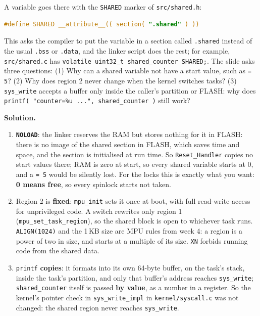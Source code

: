 A variable goes there with the \texttt{SHARED} marker of \texttt{src/shared.h}:
\begin{lstlisting}[language=C, showstringspaces=false, basicstyle=\ttfamily\footnotesize]
#define SHARED __attribute__(( section( ".shared" ) ))
\end{lstlisting}
This asks the compiler to put the variable in a section called \texttt{.shared} instead of the usual \texttt{.bss} or \texttt{.data}, and the linker script does the rest; for example, \texttt{src/shared.c} has \texttt{volatile uint32\_t shared\_counter SHARED;}. The slide asks three questions: (1) Why can a shared variable not have a start value, such as \texttt{= 5}? (2) Why does region 2 never change when the kernel switches tasks? (3) \texttt{sys\_write} accepts a buffer only inside the caller's partition or FLASH: why does \texttt{printf( "counter=\%u ...", shared\_counter )} still work?

\textbf{Solution.}
\begin{enumerate}
    \item \textbf{\texttt{NOLOAD}}: the linker reserves the RAM but stores nothing for it in FLASH: there is no image of the shared section in FLASH, which saves time and space, and the section is initialised at run time. So \texttt{Reset\_Handler} copies no start values there; RAM is zero at start, so every shared variable starts at 0, and a \texttt{= 5} would be silently lost. For the locks this is exactly what you want: \textbf{0 means free}, so every spinlock starts not taken.
    \item Region 2 is \textbf{fixed}: \texttt{mpu\_init} sets it once at boot, with full read-write access for unprivileged code. A switch rewrites only region 1 (\texttt{mpu\_set\_task\_region}), so the shared block is open to whichever task runs. \texttt{ALIGN(1024)} and the 1\,KB size are MPU rules from week 4: a region is a power of two in size, and starts at a multiple of its size. \texttt{XN} forbids running code from the shared data.
    \item \texttt{printf} \textbf{copies}: it formats into its own 64-byte buffer, on the task's stack, inside the task's partition, and only that buffer's address reaches \texttt{sys\_write}; \texttt{shared\_counter} itself is passed \textbf{by value}, as a number in a register. So the kernel's pointer check in \texttt{sys\_write\_impl} in \texttt{kernel/syscall.c} was not changed: the shared region never reaches \texttt{sys\_write}.
\end{enumerate}

